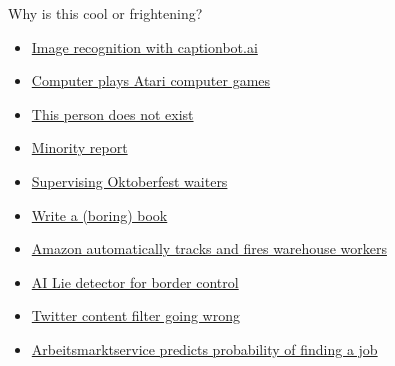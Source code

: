 \documentclass[color=usenames,dvipsnames]{beamer}
\begin{document}
\begin{frame}{Why is this cool or frightening?} 


\begin{itemize}

\item \href{https://www.captionbot.ai/}{{Image recognition with captionbot.ai}}

\item \href{https://www.youtube.com/watch?time_continue=2&v=TmPfTpjtdgg}{{Computer plays Atari computer games}}



\item \href{https://www.thispersondoesnotexist.com/}{{This person does not exist}}

\item \href{https://www.newscientist.com/article/2186512-exclusive-uk-police-wants-ai-to-stop-violent-crime-before-it-happens/}{{Minority report}}

\item \href{https://dishtracker.at/?lang=de}{{Supervising Oktoberfest waiters}}

\item \href{https://link.springer.com/book/10.1007/978-3-030-16800-1}{{Write a (boring) book}}

\item \href{https://www.theverge.com/2019/4/25/18516004/amazon-warehouse-fulfillment-centers-productivity-firing-terminations}{{Amazon automatically tracks and fires warehouse workers} }

\item \href{https://gizmodo.com/an-ai-lie-detector-is-going-to-start-questioning-travel-1830126881}{{AI Lie detector for border control}}

\item \href{https://twitter.com/oe1/status/1119239287541833728?s=08}{{Twitter content filter going wrong}}

\item \href{https://futurezone.at/netzpolitik/computer-sagt-nein-algorithmus-gibt-frauen-weniger-chancen-beim-ams/400345297}{{ Arbeitsmarktservice predicts probability of finding a job}}

\end{itemize}

\end{frame}
\end{document}
